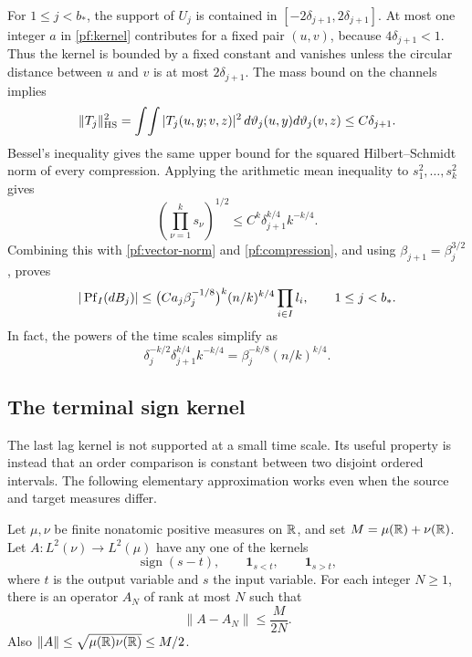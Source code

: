 For $1\le j<b_*$, the support of $U_j$ is contained in
$[-2\delta_{j+1},2\delta_{j+1}]$.  At most one integer $a$ in
\eqref{pf:kernel} contributes for a fixed pair $(u,v)$, because
$4\delta_{j+1}<1$.  Thus the kernel is bounded by a fixed constant and
vanishes unless the circular distance between $u$ and $v$ is at most
$2\delta_{j+1}$.  The mass bound on the channels implies
\[
 \|T_j\|_{\rm HS}^2
 =\int\!\int |T_j(u,y;v,z)|^2\,
       d\vartheta_j(u,y)d\vartheta_j(v,z)
 \le C\delta_{j+1}.
\]
Bessel's inequality gives the same upper bound for the squared
Hilbert--Schmidt norm of every compression.  Applying the arithmetic
mean inequality to $s_1^2,\ldots,s_k^2$ gives
\[
 \left(\prod_{\nu=1}^k s_\nu\right)^{1/2}
 \le C^k\delta_{j+1}^{k/4}k^{-k/4}.
\]
Combining this with \eqref{pf:vector-norm} and
\eqref{pf:compression}, and using $\beta_{j+1}=\beta_j^{3/2}$, proves
\begin{equation}
 |\operatorname{Pf}_I(dB_j)|
 \le\bigl(Ca_j\beta_j^{-1/8}\bigr)^k
          (n/k)^{k/4}\prod_{i\in I}l_i,
 \qquad 1\le j<b_*.
 \label{pf:intermediate}
\end{equation}
In fact, the powers of the time scales simplify as
\[
 \delta_j^{-k/2}\delta_{j+1}^{k/4}k^{-k/4}
 =\beta_j^{-k/8}(n/k)^{k/4}.
\]

\subsection{The terminal sign kernel}

The last lag kernel is not supported at a small time scale.  Its useful
property is instead that an order comparison is constant between two
disjoint ordered intervals.  The following elementary approximation
works even when the source and target measures differ.

\begin{lemma}
\label{pf:order-kernel}
Let $\mu,\nu$ be finite nonatomic positive measures on $\mathbb R$, and set
$M=\mu(\mathbb R)+\nu(\mathbb R)$.  Let $A:L^2(\nu)\to L^2(\mu)$ have any one of
the kernels
\[
 \operatorname{sign}(s-t),\qquad
 \mathbf1_{s<t},\qquad \mathbf1_{s>t},
\]
where $t$ is the output variable and $s$ the input variable.  For each
integer $N\ge1$, there is an operator $A_N$ of rank at most $N$ such
that
\[
 \|A-A_N\|\le \frac{M}{2N}.
\]
Also $\|A\|\le\sqrt{\mu(\mathbb R)\nu(\mathbb R)}\le M/2$.
\end{lemma}

